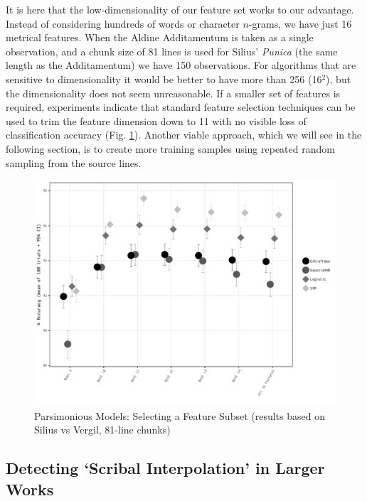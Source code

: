 \documentclass[11pt,a4paper]{scrartcl} %
\begin{document}
{It is here that the low-dimensionality of our feature set works to our advantage. Instead of considering hundreds of words or character $n$-grams, we have just 16 metrical features. When the Aldine Additamentum is taken as a single observation, and a chunk size of 81 lines is used for Silius' \textit{Punica} (the same length as the Additamentum) we have 150 observations. For algorithms that are sensitive to dimensionality it would be better to have more than 256 (16$^{2}$), but the dimensionality does not seem unreasonable. If a smaller set of features is required, experiments indicate that standard feature selection techniques can be used to trim the feature dimension down to 11 with no visible loss of classification accuracy (Fig. \ref{fig:glob_feat_sel}). Another viable approach, which we will see in the following section, is to create more training samples using repeated random sampling from the source lines.

\begin{figure}
    \caption{Parsimonious Models: Selecting a Feature Subset (results based on Silius vs Vergil, 81-line chunks)}
    \label{fig:glob_feat_sel}
    \includegraphics[width=\textwidth]{glob_feat_sel_bw.pdf}
\end{figure}

\subsection{Detecting `Scribal Interpolation' in Larger Works}

}
\end{document}
